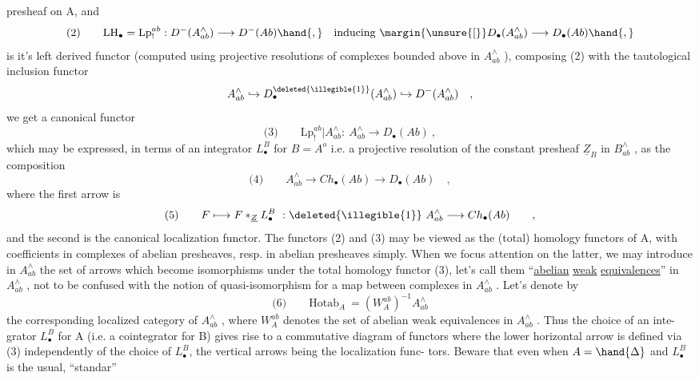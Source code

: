 
presheaf on A,  and
\[ \text{(2)}\qquad \mathrm{LH}_\bullet = \mathrm{Lp}_{!}^{ab} : D^{-}(A^{\wedge}_{ab}) \longrightarrow D^{-}(Ab) \hand{,} \quad \text{inducing}\ \margin{\unsure{[}} D_\bullet(A^{\wedge}_{ab}) \longrightarrow D_\bullet(Ab)\hand{,} \]
is it's left derived functor (computed using projective resolutions of
complexes bounded above in $A^{\wedge}_{ab}$ ),  composing (2) with the tautological
inclusion functor
\[ A^{\wedge}_{ab} \hookrightarrow D^{\deleted{\illegible{1}}}_\bullet(A^{\wedge}_{ab}) \hookrightarrow D^{-}(A^{\wedge}_{ab}) \quad , \]
we get a canonical functor
\[ \text{(3)}\qquad \mathrm{Lp}_{!}^{ab}\big| A^{\wedge}_{ab} : \ A^{\wedge}_{ab} \longrightarrow D_\bullet(Ab) \ , \]
which may be expressed,  in terms of an integrator  $L_\bullet^{B}$  for  $B = A^{o}$\hand{,}
i.e. a projective resolution of the constant presheaf $\underline{Z}_B$  in $B^{\wedge}_{ab}$ ,  as
the composition
\[ \text{(4)}\qquad A^{\wedge}_{ab} \longrightarrow Ch_\bullet(Ab) \longrightarrow D_\bullet(Ab) \quad , \]
where the first arrow is
\[ \text{(5)}\qquad F \longmapsto F *_{\underline{Z}} L_\bullet^{B} \ : \deleted{\illegible{1}}\ A^{\wedge}_{ab} \longrightarrow Ch_\bullet(Ab) \qquad , \]
and the second is the canonical localization functor.   The functors
(2) and (3) may be viewed as the (total) homology functors of A,  with
coefficients in   complexes of abelian presheaves,  resp.
in abelian presheaves simply.  When we focus attention on the latter,
we may introduce in $A^{\wedge}_{ab}$ the set of arrows which  become
isomorphisms under the  total homology functor (3),  let's call
them ``\uline{abelian} \uline{weak} \uline{equivalences}'' in $A^{\wedge}_{ab}$ ,  not to be confused with the
notion of quasi-isomorphism for a map between complexes in $A^{\wedge}_{ab}$ .  Let's
denote by
\[ \text{(6)}\qquad \mathrm{Hotab}_A \ = (W_A^{ab})^{-1} A^{\wedge}_{ab} \]
the corresponding localized category of $A^{\wedge}_{ab}$ ,  where  $W_A^{ab}$  denotes the
set of abelian weak equivalences in $A^{\wedge}_{ab}$ .   Thus the choice of an inte-%
grator  $L_\bullet^{B}$  for A (i.e. a cointegrator for B) gives rise to a commutative
diagram of functors
where the  lower horizontal arrow is defined via (3) \hand{(}independently
of the choice of $L_\bullet^{B}$\hand{)},  the vertical arrows being the localization func-%
tors.   Beware that even when  $A=\hand{\Delta}$  and $L_\bullet^{B}$  is the usual, ``standar''
